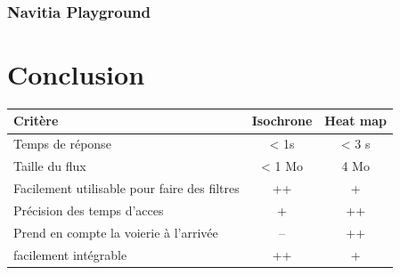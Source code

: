 \documentclass[a4paper]{report}
\begin{document}
\subsection{Navitia Playground}

\chapter*{Conclusion}

  \centering
  \begin{tabular} {|l|c|c|}
  \hline
  Critère & Isochrone & Heat map \\
  \hline
  Temps de réponse & < 1s &  < 3 s \\
  \hline
  Taille du flux & < 1 Mo & 4 Mo \\
  \hline
  Facilement utilisable pour faire des filtres & ++ & + \\
  \hline
   Précision des temps d'acces & + & ++ \\
  \hline
  Prend en compte la voierie à l'arrivée & -- & ++ \\
  \hline
  facilement intégrable & ++ & + \\
  \hline
  \end{tabular}

\appendix
\listoffigures
{}


\end{document}
